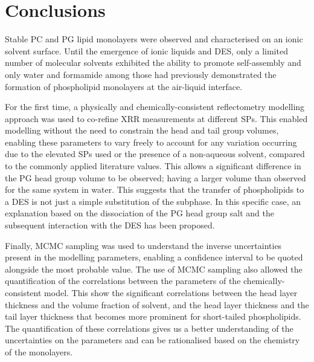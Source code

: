 \section{Conclusions}
Stable PC and PG lipid monolayers were observed and characterised on an ionic solvent surface.
Until the emergence of ionic liquids and DES, only a limited number of molecular solvents exhibited the ability to promote self-assembly and only water and formamide among those had previously demonstrated the formation of phospholipid monolayers at the air-liquid interface.\autocite{mohwald_phospholipid_1990,graner_phospholipidic_1995}

For the first time, a physically and chemically-consistent reflectometry modelling approach was used to co-refine XRR measurements at different SPs.
This enabled modelling without the need to constrain the head and tail group volumes, enabling these parameters to vary freely to account for any variation occurring due to the elevated SPs used or the presence of a non-aqueous solvent, compared to the commonly applied literature values.
This allows a significant difference in the PG head group volume to be observed; having a larger volume than observed for the same system in water.
This suggests that the transfer of phospholipids to a DES is not just a simple substitution of the subphase.
In this specific case, an explanation based on the dissociation of the PG head group salt and the subsequent interaction with the DES has been proposed.

Finally, MCMC sampling was used to understand the inverse uncertainties present in the modelling parameters, enabling a confidence interval to be quoted alongside the most probable value.
The use of MCMC sampling also allowed the quantification of the correlations between the parameters of the chemically-consistent model.
This show the significant correlations between the head layer thickness and the volume fraction of solvent, and the head layer thickness and the tail layer thickness that becomes more prominent for short-tailed phospholipids.
The quantification of these correlations gives us a better understanding of the uncertainties on the parameters and can be rationalised based on the chemistry of the monolayers.

